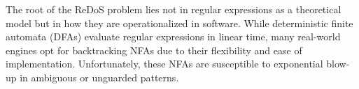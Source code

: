 The root of the ReDoS problem lies not in regular expressions as a theoretical model but in how they are operationalized in software. While deterministic finite automata (DFAs) evaluate regular expressions in linear time, many real-world engines opt for backtracking NFAs due to their flexibility and ease of implementation. Unfortunately, these NFAs are susceptible to exponential blow-up in ambiguous or unguarded patterns.